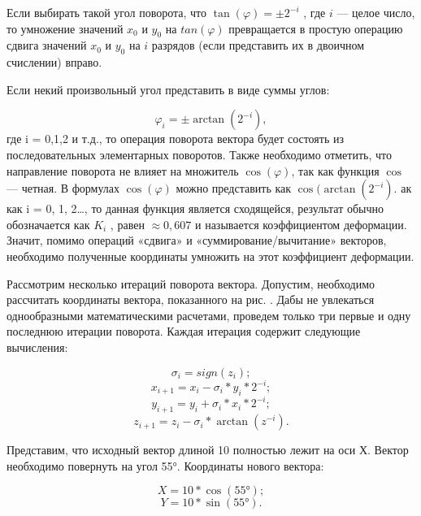 \documentclass[a4paper,oneside ,14pt]{extreport}
\begin{document}
Если выбирать такой угол поворота, что \(\tan(\varphi) = \pm2^{-i}\) 
, где \(i\) — целое число, то умножение значений 
\(x_0\) и \(y_0\) на \(tan(\varphi)\) превращается в простую операцию сдвига значений \(x_0\) и \(y_0\) на \(i\) разрядов (если представить их
в двоичном счислении) вправо.

Если некий произвольный угол представить в виде суммы углов:

\begin{displaymath}	
\varphi_i = \pm\arctan(2^{-i}), 
\end{displaymath}
где i = 0,1,2 и т.д., то операция поворота вектора будет состоять
из последовательных элементарных поворотов. Также необходимо отметить, что направление поворота не влияет на множитель \(\cos(\varphi)\),
так как функция \(\cos\) — четная. В формулах \(\cos(\varphi)\) можно представить как \(\cos(\arctan(2^{-i})\). ак как i = 0, 1, 2…, то данная функция является сходящейся, результат обычно обозначается как \(K_i\)
, равен \(\approx0,607\) и называется коэффициентом деформации. Значит, помимо 
операций «сдвига» и «суммирование/вычитание» векторов, необходимо полученные 
координаты умножить на этот коэффициент 
деформации.

Рассмотрим несколько итераций поворота вектора. Допустим, необходимо рассчитать координаты вектора, показанного на рис. . Дабы не увлекаться однообразными математическими расчетами, проведем только три первые и одну последнюю итерации поворота. Каждая итерация содержит следующие вычисления:

\begin{displaymath}	
\sigma_i = sign(z_i);
\end{displaymath}
\begin{displaymath}	
x_{i+1} = x_{i} - \sigma_i*y_i*2^{-i};
\end{displaymath}
\begin{displaymath}
y_{i+1} = y_{i} + \sigma_i*x_i*2^{-i};
\end{displaymath}
\begin{displaymath}	
z_{i+1} = z_{i} - \sigma_i*\arctan(z^{-i}).
\end{displaymath}

Представим, что исходный вектор длиной 10 полностью лежит на оси Х. 
Вектор необходимо повернуть на угол 55°. Координаты нового вектора:

\begin{displaymath}
X = 10*\cos(55°);
\end{displaymath}
\begin{displaymath}	
Y = 10*\sin(55°).
\end{displaymath}
\end{document}
